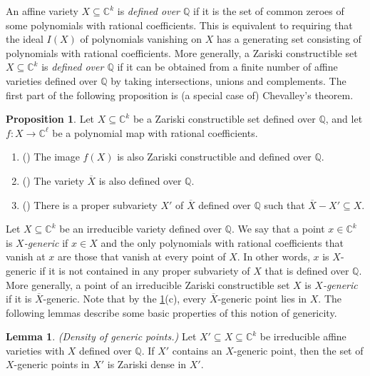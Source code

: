 \documentclass[11pt,a4paper,dvipsnames]{scrartcl}
\theoremstyle{definition}
\newtheorem{lemma}[theorem]{Lemma}
\newtheorem{proposition}[theorem]{Proposition}
\newcommand{\CC}{\mathbb{C}}
\newcommand{\QQ}{\mathbb{Q}}
\begin{document}
An affine variety $X \subseteq \CC^k$ is \emph{defined over $\QQ$} if it is the set of common zeroes of some polynomials with rational coefficients. This is equivalent to requiring that the ideal $I(X)$ of polynomials vanishing on $X$ has a generating set consisting of polynomials with rational coefficients.  More generally, a Zariski constructible set $X \subseteq \CC^k$ is \emph{defined over $\QQ$} if it can be obtained  from a finite number of affine varieties defined over $\QQ$ by taking intersections, unions and complements. The first part of the following proposition is (a special case of) Chevalley's theorem.

\begin{proposition}\label{theorem:constructiblesetsoverQ}
    Let $X \subseteq \CC^k$ be a Zariski constructible set defined over $\QQ$, and let $f: X \rightarrow \CC^\ell$ be a polynomial map with rational coefficients. 
    \begin{enumerate}
        \item (\cite[Theorem 1.22]{basu.etal_2006}) The image $f(X)$ is also Zariski constructible and defined over $\QQ$.
        \item (\cite[Theorem A.8]{gkioulekas.etal_2020}) The variety $\overline{X}$ is also defined over $\QQ$.
        \item (\cite[Lemma A.4]{gortler.etal_2019}) There is a proper subvariety $X'$ of $\overline{X}$ defined over $\QQ$ such that $\overline{X} - X' \subseteq X$.
    \end{enumerate}
\end{proposition} 

Let $X \subseteq \CC^k$ be an irreducible variety defined over $\QQ$. We say that a point $x \in \CC^k$ is \emph{$X$-generic} if $x \in X$ and the only polynomials with rational coefficients that vanish at $x$ are those that vanish at every point of $X$. In other words, $x$ is $X$-generic if it is not contained in any proper subvariety of $X$ that is defined over $\QQ$. More generally, a point of an irreducible Zariski constructible set $X$ is \emph{$X$-generic} if it is $\overline{X}$-generic. Note that by the \cref{theorem:constructiblesetsoverQ}(c), every $\overline{X}$-generic point lies in $X$. The following lemmas describe some basic properties of this notion of genericity.%


\begin{lemma}\label{lemma:genericdense}\cite[Lemma A.6]{gortler.etal_2019} \emph{(Density of generic points.)}\newline
    Let $X' \subseteq X \subseteq \CC^k$ be irreducible affine varieties with $X$ defined over $\QQ$. If $X'$ contains an $X$-generic point, then the set of $X$-generic points in $X'$ is Zariski dense in $X'$.
\end{lemma}
\end{document}
